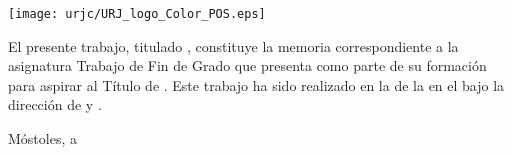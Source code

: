 \thispagestyle{empty}
\large
\begin{center}

	 \vspace{8cm}
	 
	 \centerline{\texttt{[image: urjc/URJ\_logo\_Color\_POS.eps]}}

	\vspace{1.5cm}	

  \LARGE{\textbf{\myDegreefull}}

  \vspace{7mm}


  \LARGE\textbf{\myWorkTypeFull}
        
  \vspace{1cm}   
	\Large

	\justify
	El presente trabajo, titulado \textbf{\MakeUppercase{\myBookTitle}}, constituye la memoria correspondiente a la asignatura Trabajo de Fin de Grado que presenta \textbf{\myAuthorFullName} como parte de su formación para aspirar al Título de {\myDegreefull}. Este trabajo ha sido realizado en la \textbf{\mySchool} de la {\myUniversity} en el \textbf{\myDepartment} bajo la dirección de \textbf{\myAcademicTutorFullName} y \textbf{\ifthenelse{\equal{\myCoTutorFullName}{}} {   }{\myCoTutorFullName{}}}.

  \vspace{2cm}
  \flushright
  Móstoles, a \myThesisDepositDate{}
  

\end{center}
